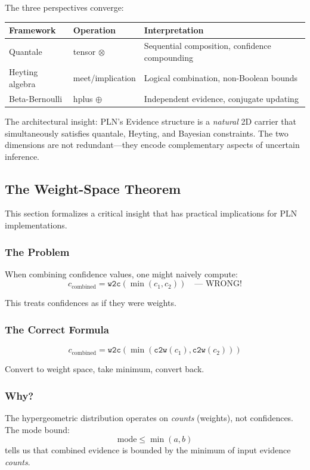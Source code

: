 \documentclass[]{article}
\begin{document}
The three perspectives converge:

\begin{center}
\begin{tabular}{lll}
\textbf{Framework} & \textbf{Operation} & \textbf{Interpretation} \\
\hline
Quantale & tensor $\otimes$ & Sequential composition, confidence compounding \\
Heyting algebra & meet/implication & Logical combination, non-Boolean bounds \\
Beta-Bernoulli & hplus $\oplus$ & Independent evidence, conjugate updating \\
\end{tabular}
\end{center}

The architectural insight: PLN's Evidence structure is a \emph{natural}
2D carrier that simultaneously satisfies quantale, Heyting, and Bayesian
constraints.  The two dimensions are not redundant---they encode
complementary aspects of uncertain inference.

\subsection{The Weight-Space Theorem}
\label{sec:weightspace}
This section formalizes a critical insight that has practical
implications for PLN implementations.

\subsubsection{The Problem}
When combining confidence values, one might naively compute:
$$c_{\text{combined}} = \texttt{w2c}(\min(c_1, c_2)) \quad \text{--- WRONG!}$$

This treats confidences as if they were weights.

\subsubsection{The Correct Formula}
$$c_{\text{combined}} = \texttt{w2c}(\min(\texttt{c2w}(c_1), \texttt{c2w}(c_2)))$$

Convert to weight space, take minimum, convert back.

\subsubsection{Why?}
The hypergeometric distribution operates on \emph{counts} (weights),
not confidences.  The mode bound:
$$\text{mode} \leq \min(a, b)$$
tells us that combined evidence is bounded by the minimum of input
evidence \emph{counts}.
\end{document}
